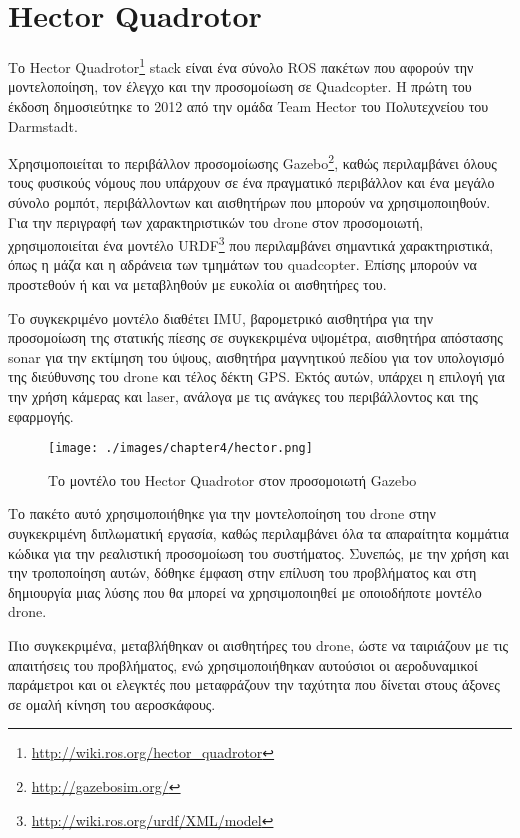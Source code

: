 \section{Hector Quadrotor}
\label{section:hector}

Το Hector Quadrotor\footnote{\href{http://wiki.ros.org/hector_quadrotor}{http://wiki.ros.org/hector\_quadrotor}} stack \cite{2012simpar_meyer} είναι ένα σύνολο ROS πακέτων που αφορούν την μοντελοποίηση, τον έλεγχο και την προσομοίωση σε Quadcopter. Η πρώτη του έκδοση δημοσιεύτηκε το 2012 από την ομάδα Team Hector του Πολυτεχνείου του Darmstadt.

Χρησιμοποιείται το περιβάλλον προσομοίωσης Gazebo\footnote{\href{http://gazebosim.org/}{http://gazebosim.org/}}, καθώς περιλαμβάνει όλους τους φυσικούς νόμους που υπάρχουν σε ένα πραγματικό περιβάλλον και ένα μεγάλο σύνολο ρομπότ, περιβάλλοντων και αισθητήρων που μπορούν να χρησιμοποιηθούν. Για την περιγραφή των χαρακτηριστικών του drone στον προσομοιωτή, χρησιμοποιείται ένα μοντέλο URDF\footnote{\href{http://wiki.ros.org/urdf/XML/model}{http://wiki.ros.org/urdf/XML/model}} που περιλαμβάνει σημαντικά χαρακτηριστικά, όπως η μάζα και η αδράνεια των τμημάτων του quadcopter. Επίσης μπορούν να προστεθούν ή και να μεταβληθούν με ευκολία οι αισθητήρες του.

Το συγκεκριμένο μοντέλο διαθέτει IMU, βαρομετρικό αισθητήρα για την προσομοίωση της στατικής πίεσης σε συγκεκριμένα υψομέτρα, αισθητήρα απόστασης sonar για την εκτίμηση του ύψους, αισθητήρα μαγνητικού πεδίου για τον υπολογισμό της διεύθυνσης του drone και τέλος δέκτη GPS. Εκτός αυτών, υπάρχει η επιλογή για την χρήση κάμερας και laser, ανάλογα με τις ανάγκες του περιβάλλοντος και της εφαρμογής.

\begin{figure}[!ht]
    \centering
    \texttt{[image: ./images/chapter4/hector.png]}
    \caption{Το μοντέλο του Hector Quadrotor στον προσομοιωτή Gazebo} 
    \label{fig:hector}
\end{figure}

Το πακέτο αυτό χρησιμοποιήθηκε για την μοντελοποίηση του drone στην συγκεκριμένη διπλωματική εργασία, καθώς περιλαμβάνει όλα τα απαραίτητα κομμάτια κώδικα για την ρεαλιστική προσομοίωση του συστήματος. Συνεπώς, με την χρήση και την τροποποίηση αυτών, δόθηκε έμφαση στην επίλυση του προβλήματος και στη δημιουργία μιας λύσης που θα μπορεί να χρησιμοποιηθεί με οποιοδήποτε μοντέλο drone. 

Πιο συγκεκριμένα, μεταβλήθηκαν οι αισθητήρες του drone, ώστε να ταιριάζουν με τις απαιτήσεις του προβλήματος, ενώ χρησιμοποιήθηκαν αυτούσιοι οι αεροδυναμικοί παράμετροι και οι ελεγκτές που μεταφράζουν την ταχύτητα που δίνεται στους άξονες σε ομαλή κίνηση του αεροσκάφους.